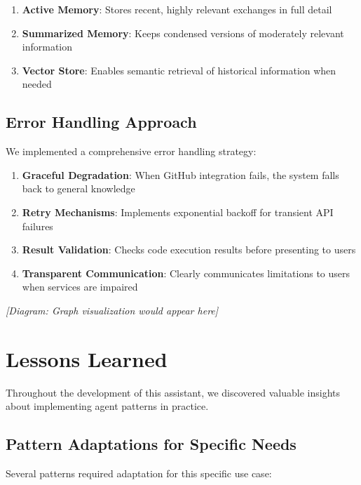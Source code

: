 \documentclass[11pt,oneside]{book}
\providecommand{\tightlist}{%
  \setlength{\itemsep}{0pt}\setlength{\parskip}{0pt}}
\begin{document}
\begin{enumerate}
\def\labelenumi{\arabic{enumi}.}
\tightlist
\item
  \textbf{Active Memory}: Stores recent, highly relevant exchanges in
  full detail
\item
  \textbf{Summarized Memory}: Keeps condensed versions of moderately
  relevant information
\item
  \textbf{Vector Store}: Enables semantic retrieval of historical
  information when needed
\end{enumerate}

\subsection{Error Handling Approach}\label{error-handling-approach}

We implemented a comprehensive error handling strategy:

\begin{enumerate}
\def\labelenumi{\arabic{enumi}.}
\tightlist
\item
  \textbf{Graceful Degradation}: When GitHub integration fails, the
  system falls back to general knowledge
\item
  \textbf{Retry Mechanisms}: Implements exponential backoff for
  transient API failures
\item
  \textbf{Result Validation}: Checks code execution results before
  presenting to users
\item
  \textbf{Transparent Communication}: Clearly communicates limitations
  to users when services are impaired
\end{enumerate}

\emph{{[}Diagram: Graph visualization would appear here{]}}

\section{Lessons Learned}\label{lessons-learned}

Throughout the development of this assistant, we discovered valuable
insights about implementing agent patterns in practice.

\subsection{Pattern Adaptations for Specific
Needs}\label{pattern-adaptations-for-specific-needs}

Several patterns required adaptation for this specific use case:
\end{document}

